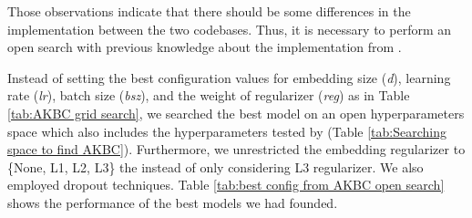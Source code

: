 Those observations indicate that there should be some differences in the implementation between the two codebases. Thus, it is necessary to perform an open search with previous knowledge about the implementation from \citet{chen2021relation}. 

\begin{table}[!htbp]
\centering
{}
\caption{Searching space to find AKBC}
\label{tab:Searching space to find AKBC}
\end{table}


Instead of setting the best configuration values for embedding size (\textit{d}), learning rate (\textit{lr}), batch size (\textit{bsz}), and the weight of regularizer (\textit{reg}) as in Table \ref{tab:AKBC grid search}, we searched the best model on an open hyperparameters space which also includes the hyperparameters tested by \citet{chen2021relation} (Table \ref{tab:Searching space to find AKBC}). Furthermore, we unrestricted the embedding regularizer to \{None, L1, L2, L3\} the instead of only considering L3 regularizer. We also employed dropout techniques. Table \ref{tab:best config from AKBC open search} shows the performance of the best models we had founded.

